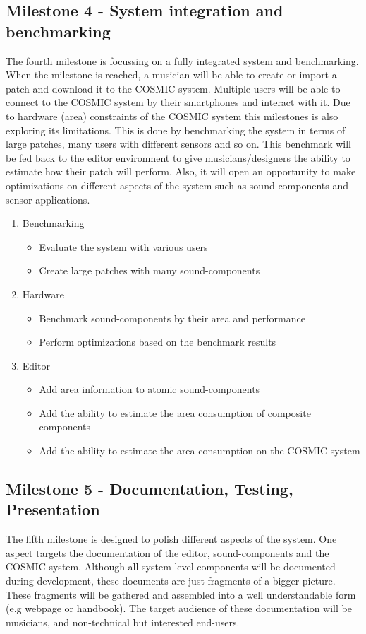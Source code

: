 \subsection{Milestone 4 - System integration and benchmarking}

The fourth milestone is focussing on a fully integrated system and benchmarking.
When the milestone is reached, a musician will be able to create or import a patch and download it to the \ac{COSMIC} system. 
Multiple users will be able to connect to the \ac{COSMIC} system by their smartphones and interact with it. 
Due to hardware (area) constraints of the \ac{COSMIC} system this milestones is also exploring its limitations. 
This is done by benchmarking the system in terms of large patches, many users with different sensors and so on. 
This benchmark will be fed back to the editor environment to give musicians/designers the ability to estimate how their patch will perform. 
Also, it will open an opportunity to make optimizations on different aspects of the system such as sound-components and sensor applications.

	\begin{enumerate}
		\item Benchmarking
			\begin{itemize}
				\item Evaluate the system with various users
				\item Create large patches with many sound-components
			\end{itemize}
		\item Hardware
			\begin{itemize}
				\item Benchmark sound-components by their area and performance
				\item Perform optimizations based on the benchmark results
			\end{itemize}
		\item Editor
			\begin{itemize}
				\item Add area information to atomic sound-components
				\item Add the ability to estimate the area consumption of composite components
				\item Add the ability to estimate the area consumption on the \ac{COSMIC} system
			\end{itemize}
	\end{enumerate}

\subsection{Milestone 5 - Documentation, Testing, Presentation}

The fifth milestone is designed to polish different aspects of the system. 
One aspect targets the documentation of the editor, sound-components and the \ac{COSMIC} system. 
Although all system-level components will be documented during development, these documents are just fragments of a bigger picture. 
These fragments will be gathered and assembled into a well understandable form (e.g webpage or handbook). 
The target audience of these documentation will be musicians, and non-technical but interested end-users.  